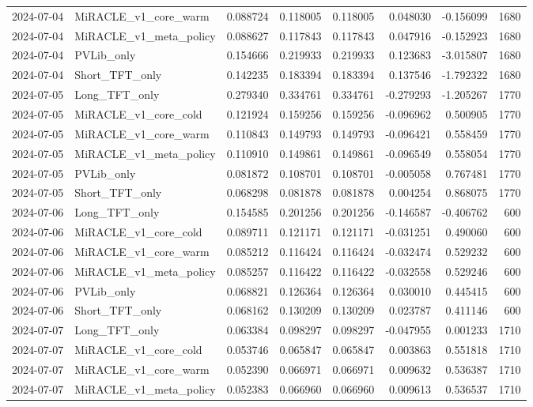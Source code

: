 \begin{tabular}{llrrrrrr}
2024-07-04 & MiRACLE_v1_core_warm & 0.088724 & 0.118005 & 0.118005 & 0.048030 & -0.156099 & 1680 \\
2024-07-04 & MiRACLE_v1_meta_policy & 0.088627 & 0.117843 & 0.117843 & 0.047916 & -0.152923 & 1680 \\
2024-07-04 & PVLib_only & 0.154666 & 0.219933 & 0.219933 & 0.123683 & -3.015807 & 1680 \\
2024-07-04 & Short_TFT_only & 0.142235 & 0.183394 & 0.183394 & 0.137546 & -1.792322 & 1680 \\
2024-07-05 & Long_TFT_only & 0.279340 & 0.334761 & 0.334761 & -0.279293 & -1.205267 & 1770 \\
2024-07-05 & MiRACLE_v1_core_cold & 0.121924 & 0.159256 & 0.159256 & -0.096962 & 0.500905 & 1770 \\
2024-07-05 & MiRACLE_v1_core_warm & 0.110843 & 0.149793 & 0.149793 & -0.096421 & 0.558459 & 1770 \\
2024-07-05 & MiRACLE_v1_meta_policy & 0.110910 & 0.149861 & 0.149861 & -0.096549 & 0.558054 & 1770 \\
2024-07-05 & PVLib_only & 0.081872 & 0.108701 & 0.108701 & -0.005058 & 0.767481 & 1770 \\
2024-07-05 & Short_TFT_only & 0.068298 & 0.081878 & 0.081878 & 0.004254 & 0.868075 & 1770 \\
2024-07-06 & Long_TFT_only & 0.154585 & 0.201256 & 0.201256 & -0.146587 & -0.406762 & 600 \\
2024-07-06 & MiRACLE_v1_core_cold & 0.089711 & 0.121171 & 0.121171 & -0.031251 & 0.490060 & 600 \\
2024-07-06 & MiRACLE_v1_core_warm & 0.085212 & 0.116424 & 0.116424 & -0.032474 & 0.529232 & 600 \\
2024-07-06 & MiRACLE_v1_meta_policy & 0.085257 & 0.116422 & 0.116422 & -0.032558 & 0.529246 & 600 \\
2024-07-06 & PVLib_only & 0.068821 & 0.126364 & 0.126364 & 0.030010 & 0.445415 & 600 \\
2024-07-06 & Short_TFT_only & 0.068162 & 0.130209 & 0.130209 & 0.023787 & 0.411146 & 600 \\
2024-07-07 & Long_TFT_only & 0.063384 & 0.098297 & 0.098297 & -0.047955 & 0.001233 & 1710 \\
2024-07-07 & MiRACLE_v1_core_cold & 0.053746 & 0.065847 & 0.065847 & 0.003863 & 0.551818 & 1710 \\
2024-07-07 & MiRACLE_v1_core_warm & 0.052390 & 0.066971 & 0.066971 & 0.009632 & 0.536387 & 1710 \\
2024-07-07 & MiRACLE_v1_meta_policy & 0.052383 & 0.066960 & 0.066960 & 0.009613 & 0.536537 & 1710 \\

\end{tabular}

